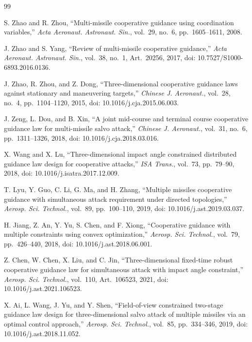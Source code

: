 \begin{thebibliography}{99}

S. Zhao and R. Zhou, ``Multi-missile cooperative guidance using coordination variables,'' \textit{Acta Aeronaut. Astronaut. Sin.}, vol.~29, no.~6, pp.~1605--1611, 2008.

J. Zhao and S. Yang, ``Review of multi-missile cooperative guidance,'' \textit{Acta Aeronaut. Astronaut. Sin.}, vol.~38, no.~1, Art.~20256, 2017, doi: 10.7527/S1000-6893.2016.0136.

J. Zhao, R. Zhou, and Z. Dong, ``Three-dimensional cooperative guidance laws against stationary and maneuvering targets,'' \textit{Chinese J. Aeronaut.}, vol.~28, no.~4, pp.~1104--1120, 2015, doi: 10.1016/j.cja.2015.06.003.

J. Zeng, L. Dou, and B. Xin, ``A joint mid-course and terminal course cooperative guidance law for multi-missile salvo attack,'' \textit{Chinese J. Aeronaut.}, vol.~31, no.~6, pp.~1311--1326, 2018, doi: 10.1016/j.cja.2018.03.016.

X. Wang and X. Lu, ``Three-dimensional impact angle constrained distributed guidance law design for cooperative attacks,'' \textit{ISA Trans.}, vol.~73, pp.~79--90, 2018, doi: 10.1016/j.isatra.2017.12.009.

T. Lyu, Y. Guo, C. Li, G. Ma, and H. Zhang, ``Multiple missiles cooperative guidance with simultaneous attack requirement under directed topologies,'' \textit{Aerosp. Sci. Technol.}, vol.~89, pp.~100--110, 2019, doi: 10.1016/j.ast.2019.03.037.

H. Jiang, Z. An, Y. Yu, S. Chen, and F. Xiong, ``Cooperative guidance with multiple constraints using convex optimization,'' \textit{Aerosp. Sci. Technol.}, vol.~79, pp.~426--440, 2018, doi: 10.1016/j.ast.2018.06.001.

Z. Chen, W. Chen, X. Liu, and C. Jin, ``Three-dimensional fixed-time robust cooperative guidance law for simultaneous attack with impact angle constraint,'' \textit{Aerosp. Sci. Technol.}, vol.~110, Art.~106523, 2021, doi: 10.1016/j.ast.2021.106523.

X. Ai, L. Wang, J. Yu, and Y. Shen, ``Field-of-view constrained two-stage guidance law design for three-dimensional salvo attack of multiple missiles via an optimal control approach,'' \textit{Aerosp. Sci. Technol.}, vol.~85, pp.~334--346, 2019, doi: 10.1016/j.ast.2018.11.052.


\end{thebibliography}
